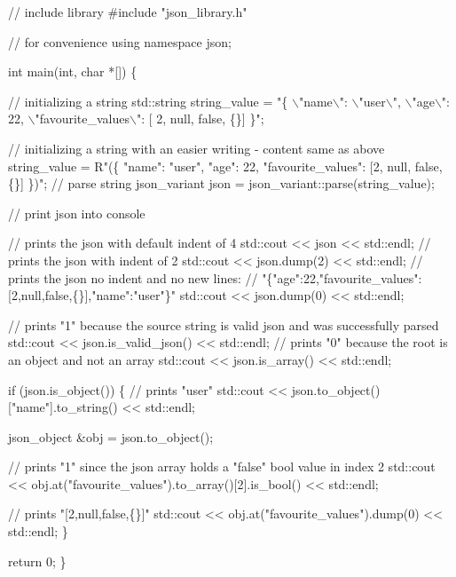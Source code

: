 \begin{DoxyCode}
\textcolor{comment}{// include library}
\textcolor{preprocessor}{#include "json\_library.h"}

\textcolor{comment}{// for convenience}
\textcolor{keyword}{using namespace }json;

\textcolor{keywordtype}{int} main(\textcolor{keywordtype}{int}, \textcolor{keywordtype}{char} *[]) \{

    \textcolor{comment}{// initializing a string}
    std::string string\_value = \textcolor{stringliteral}{"\{ }
\textcolor{stringliteral}{        \(\backslash\)"name\(\backslash\)": \(\backslash\)"user\(\backslash\)", }
\textcolor{stringliteral}{        \(\backslash\)"age\(\backslash\)": 22, }
\textcolor{stringliteral}{        \(\backslash\)"favourite\_values\(\backslash\)": [ 2, null, false, \{\}] }
\textcolor{stringliteral}{    \}"};

    \textcolor{comment}{// initializing a string with an easier writing - content same as above}
    string\_value = R\textcolor{stringliteral}{"(\{}
\textcolor{stringliteral}{        "name": "user",}
\textcolor{stringliteral}{        "age": 22,}
\textcolor{stringliteral}{        "favourite\_values": [2, null, false, \{\}]}
\textcolor{stringliteral}{    \})";}
\textcolor{stringliteral}{}
\textcolor{stringliteral}{    }\textcolor{comment}{// parse string}
    json\_variant json = json\_variant::parse(string\_value);

    \textcolor{comment}{// print json into console}

    \textcolor{comment}{// prints the json with default indent of 4}
    std::cout << json << std::endl;
    \textcolor{comment}{// prints the json with indent of 2    }
    std::cout << json.dump(2) << std::endl;     
    \textcolor{comment}{// prints the json no indent and no new lines: }
    \textcolor{comment}{// "\{"age":22,"favourite\_values":[2,null,false,\{\}],"name":"user"\}"}
    std::cout << json.dump(0) << std::endl;     

    \textcolor{comment}{// prints "1" because the source string is valid json and was successfully parsed}
    std::cout << json.is\_valid\_json() << std::endl; 
     \textcolor{comment}{// prints "0" because the root is an object and not an array}
    std::cout << json.is\_array() << std::endl;     

    \textcolor{keywordflow}{if} (json.is\_object()) \{
        \textcolor{comment}{// prints "user"}
        std::cout << json.to\_object()[\textcolor{stringliteral}{"name"}].to\_string() << std::endl;                 

        json\_object &obj = json.to\_object();

        \textcolor{comment}{// prints "1" since the json array holds a "false" bool value in index 2}
        std::cout << obj.at(\textcolor{stringliteral}{"favourite\_values"}).to\_array()[2].is\_bool() << std::endl;   

        \textcolor{comment}{// prints "[2,null,false,\{\}]"}
        std::cout << obj.at(\textcolor{stringliteral}{"favourite\_values"}).dump(0) << std::endl;                  
    \}

    \textcolor{keywordflow}{return} 0;
\}
\end{DoxyCode}


